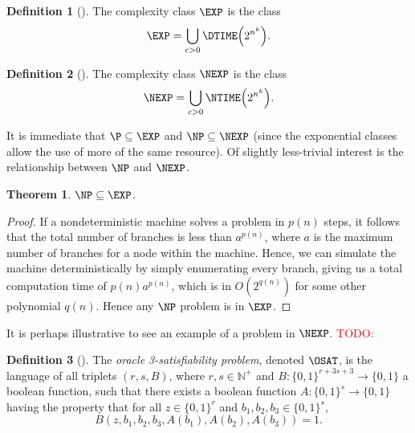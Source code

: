 \documentclass[english,12pt]{reedthesis}
\theoremstyle{plain}
\newtheorem{thm}{Theorem}[section]
\theoremstyle{definition}
\newtheorem{defn}[defn]{Definition}
\theoremstyle{remark}
\newcommand{\TODO}[1]{\textcolor{red}{TODO: #1}}
\begin{document}
\begin{defn}[{\cite[.2]{AB09}}]\label{def:exp}
  The complexity class $\EXP$ is the class
  \[
    \EXP = \bigcup_{c > 0}\DTIME\mleft(2^{n^{k}}\mright).
  \]
\end{defn}

\begin{defn}[{\cite[.2]{AB09}}]\label{def:nexp}
  The complexity class $\NEXP$ is the class
  \[
    \NEXP = \bigcup_{c > 0}\NTIME\mleft(2^{n^{k}}\mright).
  \]
\end{defn}

It is immediate that $\P \subseteq \EXP$ and $\NP \subseteq \NEXP$ (since the exponential
classes allow the use of more of the same resource). Of slightly less-trivial
interest is the relationship between $\NP$ and $\NEXP$.

\begin{thm}\label{thm:np-exp}
  $\NP \subseteq \EXP$.
\end{thm}

\begin{proof}
  If a nondeterministic machine solves a problem in $p(n)$ steps, it follows
  that the total number of branches is less than $a^{p(n)}$, where $a$ is the
  maximum number of branches for a node within the machine. Hence, we can
  simulate the machine deterministically by simply enumerating every branch,
  giving us a total computation time of $p(n)a^{p(n)}$, which is in
  $O(2^{q(n)})$ for some other polynomial $q(n)$. Hence any $\NP$ problem is in
  $\EXP$.
\end{proof}

It is perhaps illustrative to see an example of a problem in $\NEXP$. \TODO{}

\begin{defn}[{\cite[Def.\ 14.1]{CFGS22}}]\label{def:oracle-3sat}
  The \emph{oracle 3-satisfiability problem}, denoted $\OSAT$, is the language
  of all triplets $(r, s, B)$, where $r, s \in \mathbb{N}^{+}$ and
  $B\colon \{0, 1\}^{r+3s+3} \rightarrow \{0, 1\}$ a boolean function, such that there
  exists a boolean function $A\colon \{0, 1\}^{s} \rightarrow \{0, 1\}$ having
  the property that for all $z \in \{0, 1\}^{r}$ and
  $b_{1}, b_{2}, b_{3} \in \{0, 1\}^{s}$,
  \begin{equation*}
    B(z, b_{1}, b_{2}, b_{3}, A(b_{1}), A(b_{2}), A(b_{3})) = 1.
  \end{equation*}
\end{defn}
\end{document}
